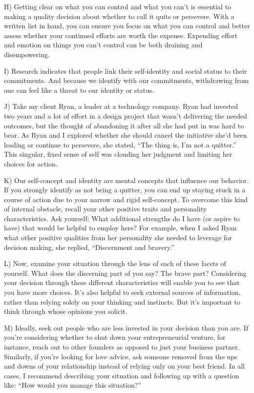 \documentclass[UTF8,11pt]{ctexart}
\begin{document}
H) Getting clear on what you can control and what you can’t is essential to making a quality decision about whether to call it quits or persevere. With a written list in hand, you can ensure you focus on what you can control and better assess whether your continued efforts are worth the expense. Expending effort and emotion on things you can’t control can be both draining and disempowering.


I) Research indicates that people link their self-identity and social status to their commitments. And because we identify with our commitments, withdrawing from one can feel like a threat to our identity or status.


J) Take my client Ryan, a leader at a technology company. Ryan had invested two years and a lot of effort in a design project that wasn’t delivering the needed outcomes, but the thought of abandoning it after all she had put in was hard to bear. As Ryan and I explored whether she should cancel the initiative she’d been leading or continue to persevere, she stated, “The thing is, I’m not a quitter.” This singular, fixed sense of self was clouding her judgment and limiting her choices for action.


K) Our self-concept and identity are mental concepts that influence our behavior. If you strongly identify as not being a quitter, you can end up staying stuck in a course of action due to your narrow and rigid self-concept. To overcome this kind of internal obstacle, recall your other positive traits and personality characteristics. Ask yourself: What additional strengths do I have (or aspire to have) that would be helpful to employ here? For example, when I asked Ryan what other positive qualities from her personality she needed to leverage for decision making, she replied, “Discernment and bravery.”


L) Now, examine your situation through the lens of each of these facets of yourself. What does the discerning part of you say? The brave part? Considering your decision through these different characteristics will enable you to see that you have more choices. It’s also helpful to seek external sources of information, rather than relying solely on your thinking and instincts. But it’s important to think through whose opinions you solicit.


M) Ideally, seek out people who are less invested in your decision than you are. If you’re considering whether to shut down your entrepreneurial venture, for instance, reach out to other founders as opposed to just your business partner. Similarly, if you’re looking for love advice, ask someone removed from the ups and downs of your relationship instead of relying only on your best friend. In all cases, I recommend describing your situation and following up with a question like: “How would you manage this situation?”
\end{document}
